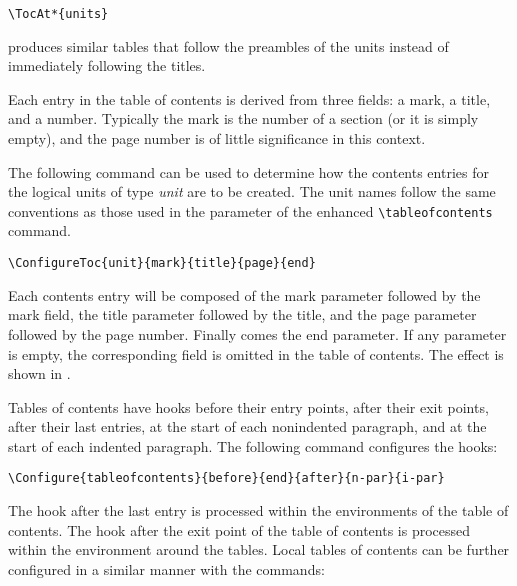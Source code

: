 \begin{lstlisting}
\TocAt*{units} 
\end{lstlisting}

produces similar tables that follow the preambles of the units instead
of immediately following the titles. 
 
 

Each entry in the table of contents is derived from three fields: a
mark, a title, and a number. Typically the mark is the number of a
section (or it is simply empty), and the page number is of little
significance in this context. 

The following command can be used to determine how the contents entries 
for the logical units of type \emph{unit} are to be created. The unit names follow the same 
conventions as those used in the parameter of the enhanced \verb|\tableofcontents| 
command. 

\begin{lstlisting}
\ConfigureToc{unit}{mark}{title}{page}{end} 
\end{lstlisting}

Each contents entry will be composed of the mark parameter followed by the mark 
field, the title parameter followed by the title, and the page parameter followed 
by the page number. Finally comes the end parameter. If any parameter is empty, 
the corresponding field is omitted in the table of contents. The effect is shown in 
. 


Tables of contents have hooks before their entry points, after their exit points, after 
their last entries, at the start of each nonindented paragraph, and at the start of each 
indented paragraph. The following command configures the hooks: 

\begin{lstlisting}
\Configure{tableofcontents}{before}{end}{after}{n-par}{i-par} 
\end{lstlisting}

The hook after the last entry is processed within the environments of
the table of contents. The hook after the exit point of the table of
contents is processed within the environment around the tables.  Local
tables of contents can be further configured in a similar manner with
the 
commands: 

